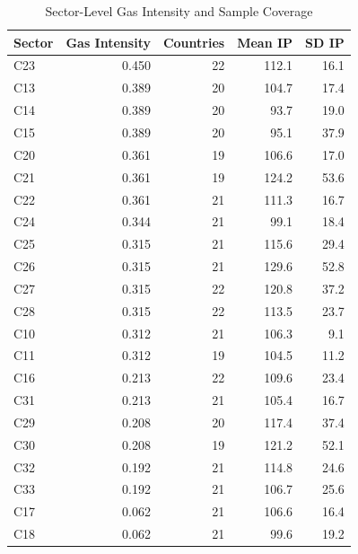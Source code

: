 \begin{table}[!h]
\centering
\caption{\label{tab:tab:sectors}Sector-Level Gas Intensity and Sample Coverage}
\centering
\begin{tabular}[t]{lrrrr}
\toprule
Sector & Gas Intensity & Countries & Mean IP & SD IP\\
\midrule
C23 & 0.450 & 22 & 112.1 & 16.1\\
C13 & 0.389 & 20 & 104.7 & 17.4\\
C14 & 0.389 & 20 & 93.7 & 19.0\\
C15 & 0.389 & 20 & 95.1 & 37.9\\
C20 & 0.361 & 19 & 106.6 & 17.0\\
\addlinespace
C21 & 0.361 & 19 & 124.2 & 53.6\\
C22 & 0.361 & 21 & 111.3 & 16.7\\
C24 & 0.344 & 21 & 99.1 & 18.4\\
C25 & 0.315 & 21 & 115.6 & 29.4\\
C26 & 0.315 & 21 & 129.6 & 52.8\\
\addlinespace
C27 & 0.315 & 22 & 120.8 & 37.2\\
C28 & 0.315 & 22 & 113.5 & 23.7\\
C10 & 0.312 & 21 & 106.3 & 9.1\\
C11 & 0.312 & 19 & 104.5 & 11.2\\
C16 & 0.213 & 22 & 109.6 & 23.4\\
\addlinespace
C31 & 0.213 & 21 & 105.4 & 16.7\\
C29 & 0.208 & 20 & 117.4 & 37.4\\
C30 & 0.208 & 19 & 121.2 & 52.1\\
C32 & 0.192 & 21 & 114.8 & 24.6\\
C33 & 0.192 & 21 & 106.7 & 25.6\\
\addlinespace
C17 & 0.062 & 21 & 106.6 & 16.4\\
C18 & 0.062 & 21 & 99.6 & 19.2\\
\bottomrule
\end{tabular}
\end{table}
